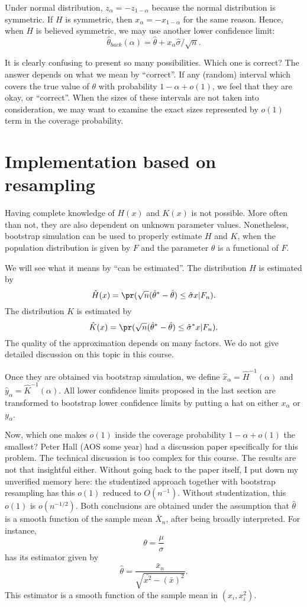 Under normal distribution, $z_\alpha = - z_{1-\alpha}$ because
the normal distribution is symmetric. If $H$ is symmetric, then
$x_\alpha = - x_{1-\alpha}$ for the same reason. 
Hence, when $H$ is believed symmetric, we may use
another lower confidence limit:
\[
\hat \theta_{back} (\alpha ) 
= 
\hat \theta +  x_\alpha  \hat{\sigma}/\sqrt{n}.
\]

It is clearly confusing to present so many possibilities.
Which one is correct? The answer depends on what we
mean by ``correct''. If any (random) interval which covers
the true value of $\theta$ with probability $1-\alpha + o(1)$,
we feel that they are okay, or ``correct''.
When the sizes of these intervals are not taken into consideration,
we may want to examine the exact sizes represented
by $o(1)$ term in the coverage probability.


\section{Implementation based on resampling}
Having complete knowledge of $H(x)$ and $K(x)$ is not possible. 
More often than not, they are also dependent on unknown parameter
values. Nonetheless, bootstrap simulation can be used to properly
estimate $H$ and $K$, when the population distribution is given
by $F$ and the parameter $\theta$ is a functional of $F$.

We will see what it means by ``can be estimated''.
The distribution $H$ is estimated by
\[
\hat H(x) = \pr( \sqrt{n} (\hat \theta^* - \hat \theta) \leq \hat \sigma x |F_n).
\]
The distribution $K$ is estimated by
\[
\hat K(x) = \pr( \sqrt{n} (\hat \theta^* - \hat \theta) \leq \hat \sigma^* x |F_n).
\]
The quality of the approximation depends on many factors.
We do not give detailed discussion on this topic in this course.

Once they are obtained via bootstrap simulation, we define
$\hat x_\alpha = \hat H^{-1}(\alpha)$ and 
$\hat y_{\alpha} = \hat K^{-1} (\alpha)$.
All lower confidence limits proposed in the last section
are transformed to bootstrap lower confidence limits by putting
a hat on either $x_\alpha$ or $y_\alpha$.

Now, which one makes $o(1)$ inside the coverage probability
$1-\alpha + o(1)$ the smallest? Peter Hall (AOS some year) had
a discussion paper specifically for this problem. The technical
discussion is too complex for this course. The results are not that
insightful either. Without going back to the paper itself, I put down
my unverified memory here: the studentized approach together with
bootstrap resampling has this $o(1)$ reduced to $O(n^{-1})$. 
Without studentization, this $o(1)$ is $o(n^{-1/2})$. Both conclusions
are obtained under the assumption that $\hat \theta$ is a smooth function
of the sample mean $\bar X_n$, after being broadly interpreted.
For instance,
\[
\theta  = \frac{\mu}{\sigma}
\]
has its estimator given by
\[
\hat \theta = \frac{\bar x_n}{\sqrt{\bar{x^2} - (\bar x)^2}}.
\]
This estimator is a smooth function of the sample mean in
$(x_i, x_i^2)$.

